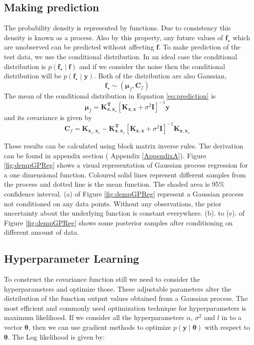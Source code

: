 \subsection{Making prediction}
The probability density is represented by functions. Due to consistency this density is known as a process. Also by this property, any future values of $\mathbf{f_\star}$ which are unobserved can be predicted without affecting $\mathbf{f}$. To make prediction of the test data, we use the conditional distribution. In an ideal case the conditional distribution is $ p\left( \mathbf{f_\star} \middle| \mathbf{f} \right) $ and if we consider the noise then the conditional distribution will be $ p\left( \mathbf{f_\star} \middle| \mathbf{y} \right) $. Both of the distribution are also Gaussian,
\begin{equation} \label{eq:prediction}
  \mathbf{f_\star}  \sim \left( \boldsymbol{\mu}_f, \mathbf{C}_f \right)
\end{equation}
The mean of the conditional distribution in Equation \ref{eq:prediction} is
\begin{equation} \label{eq:prediction_mean}
  \boldsymbol{\mu}_f = \mathbf{K_{x,x_\star}^T} \left[ \mathbf{K_{x,x}}+ \sigma^2\mathbf{I} \right]^{-1} \mathbf{y}
\end{equation}
and its covariance is given by
\begin{equation} \label{eq:prediction_cov}
  \mathbf{C}_f = \mathbf{K_{x_\star,x_\star}} -
		\mathbf{K_{x,x_\star}^T} \left[ \mathbf{K_{x,x}}+ \sigma^2\mathbf{I} \right]^{-1} \mathbf{K_{x,x_\star}}
\end{equation}

These results can be calculated using block matrix inverse rules. The derivation can be found in appendix section ({\color{red} Appendix \ref{AppendixA}}). Figure \ref{fig:dempGPReg} shows a visual representation of Gaussian process regression for a one dimensional function. Coloured solid lines represent different samples from the process and dotted line is the mean function. The shaded area is 95\% confidence interval. (a) of Figure \ref{fig:dempGPReg} represent a Gaussian process not conditioned on any data points. Without any observations, the prior uncertainty about the underlying function is constant everywhere. (b). to (e). of Figure \ref{fig:dempGPReg} shows some posterior samples after conditioning on different amount of data. 



\subsection{Hyperparameter Learning}
To construct the covariance function still we need to consider the hyperparameters and optimize those. These adjustable parameters alter the distribution of the function output values obtained from a Gaussian process. The most efficient and commonly used optimization technique for hyperparameters is maximum likelihood. If we consider all the hyperparameters $\alpha$, $\sigma^2$ and $l$ in to a vector $\boldsymbol{\theta}$, then we can use gradient methods to optimize $p \left(\mathbf{y}\middle|\boldsymbol{\theta}\right)$ with respect to $\boldsymbol{\theta}$. The Log likelihood is given by:

